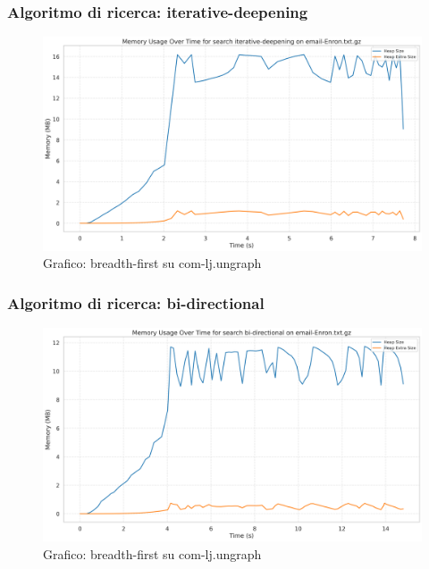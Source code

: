 \documentclass{article}
\begin{document}
\subsubsection{Algoritmo di ricerca: iterative-deepening}
\begin{figure}[h]\centering
\includegraphics[width=\textwidth]{../plots/email-Enron_iterative-deepening.png}
\caption{Grafico: breadth-first su com-lj.ungraph}
\end{figure}
\subsubsection{Algoritmo di ricerca: bi-directional}
\begin{figure}[h]\centering
\includegraphics[width=\textwidth]{../plots/email-Enron_bi-directional.png}
\caption{Grafico: breadth-first su com-lj.ungraph}
\end{figure}
\end{document}
